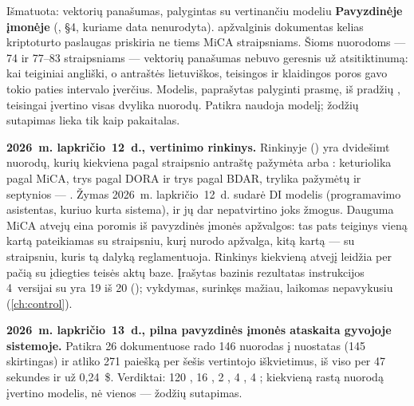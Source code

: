 \begin{lessonbox}{Išmatuota: vektorių panašumas, palygintas su vertinančiu modeliu}
\textbf{Pavyzdinėje įmonėje} (, §4, kuriame data nenurodyta).
\demo{} apžvalginis dokumentas kelias kriptoturto paslaugas priskiria ne tiems MiCA
straipsniams. Šioms nuorodoms --- 74 ir 77--83 straipsniams --- vektorių panašumas nebuvo
geresnis už atsitiktinumą: kai teiginiai angliški, o antraštės lietuviškos, teisingos ir
klaidingos poros gavo tokio paties intervalo įverčius. Modelis, paprašytas palyginti prasmę,
iš pradžių , teisingai įvertino visas dvylika nuorodų. Patikra naudoja
modelį; žodžių sutapimas lieka tik kaip pakaitalas.

\textbf{2026~m. lapkričio~12~d., vertinimo rinkinys.} Rinkinyje 
() yra dvidešimt nuorodų, kurių kiekviena pagal
straipsnio antraštę pažymėta  arba : keturiolika pagal MiCA, trys
pagal DORA ir trys pagal BDAR, trylika pažymėtų  ir septynios --- .
Žymas 2026~m. lapkričio~12~d. sudarė DI modelis (programavimo asistentas, kuriuo kurta
sistema), ir jų dar nepatvirtino joks žmogus. Dauguma MiCA atvejų eina poromis iš pavyzdinės
įmonės apžvalgos: tas pats teiginys vieną kartą pateikiamas su straipsniu, kurį nurodo
apžvalga, kitą kartą --- su straipsniu, kuris tą dalyką reglamentuoja. Rinkinys kiekvieną atvejį
leidžia per pačią  su įdiegties teisės aktų baze. Įrašytas bazinis
rezultatas instrukcijos 4~versijai su  yra 19 iš 20
(); vykdymas, surinkęs mažiau, laikomas nepavykusiu (\cref{ch:control}).

\textbf{2026~m. lapkričio~13~d., pilna pavyzdinės įmonės ataskaita gyvojoje sistemoje.}
Patikra 26 dokumentuose rado 146 nuorodas į nuostatas (145 skirtingas) ir atliko 271 paiešką
per šešis vertintojo iškvietimus, iš viso per 47 sekundes ir už 0,24~\$. Verdiktai: 120
, 16 , 2 , 4 , 4
; kiekvieną rastą nuorodą įvertino modelis, nė vienos --- žodžių sutapimas.
\end{lessonbox}

